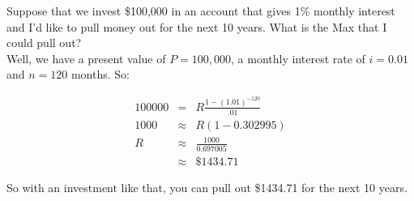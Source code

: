 Suppose that we invest \$100,000 in an account that gives 1\% monthly interest and I'd like to pull money out for the next 10 years.  What is the Max that I could pull out?\\

Well, we have a present value of $P=100,000$, a monthly interest rate of $i=0.01$ and $n=120$ months.  So:

\begin{eqnarray*}
100000&=&R\frac{1-(1.01)^{-120}}{.01}\\
1000&\approx&R(1-0.302995)\\
R&\approx&\frac{1000}{0.697005}\\
&\approx&\$1434.71
\end{eqnarray*}

So with an investment like that, you can pull out \$1434.71 for the next 10 years.







